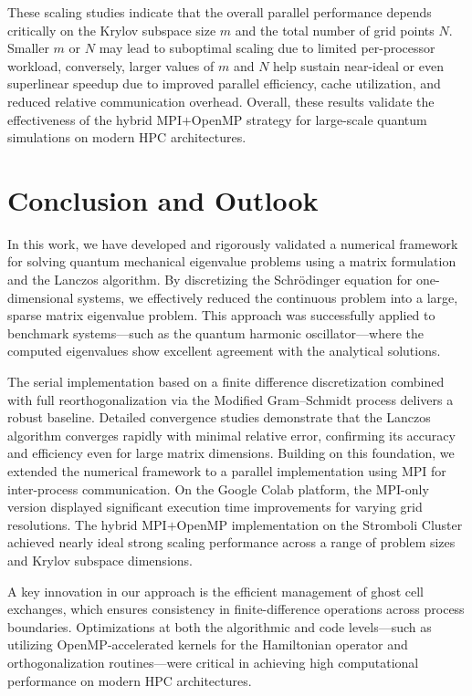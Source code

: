 \documentclass[12pt,a4paper]{report}
\begin{document}
These scaling studies indicate that the overall parallel performance depends critically on the Krylov subspace size $m$ and the total number of grid points $N$. Smaller $m$ or $N$ may lead to suboptimal scaling due to limited per-processor workload, conversely, larger values of $m$ and $N$ help sustain near-ideal or even superlinear speedup due to improved parallel efficiency, cache utilization, and reduced relative communication overhead. Overall, these results validate the effectiveness of the hybrid MPI$+$OpenMP strategy for large-scale quantum simulations \cite{Heath2002} on modern HPC architectures.


\chapter{Conclusion and Outlook}

In this work, we have developed and rigorously validated a numerical framework for solving quantum mechanical eigenvalue problems using a matrix formulation and the Lanczos algorithm. By discretizing the Schrödinger equation for one-dimensional systems, we effectively reduced the continuous problem into a large, sparse matrix eigenvalue problem. This approach was successfully applied to benchmark systems—such as the quantum harmonic oscillator—where the computed eigenvalues show excellent agreement with the analytical solutions.

The serial implementation based on a finite difference discretization combined with full reorthogonalization via the Modified Gram–Schmidt process delivers a robust baseline. Detailed convergence studies demonstrate that the Lanczos algorithm converges rapidly with minimal relative error, confirming its accuracy and efficiency even for large matrix dimensions. Building on this foundation, we extended the numerical framework to a parallel implementation using MPI for inter-process communication. On the Google Colab platform, the MPI-only version displayed significant execution time improvements for varying grid resolutions. The hybrid MPI$+$OpenMP implementation on the Stromboli Cluster achieved nearly ideal strong scaling performance across a range of problem sizes and Krylov subspace dimensions.

A key innovation in our approach is the efficient management of ghost cell exchanges, which ensures consistency in finite-difference operations across process boundaries. Optimizations at both the algorithmic and code levels—such as utilizing OpenMP-accelerated kernels for the Hamiltonian operator and orthogonalization routines—were critical in achieving high computational performance on modern HPC architectures.
\end{document}
